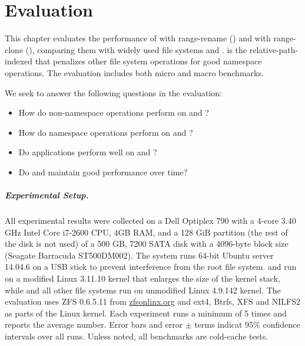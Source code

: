 \chapter{Evaluation}
\label{chap:eval}

This chapter evaluates the performance of \betrfs with
range-rename (\betrfsFour) and \betrfs with range-clone (\betrfsFive),
comparing them with widely used file systems and \betrfsThree.
\betrfsThree is the relative-path-indexed \betrfs that penalizes other file system
operations for good namespace operations.
The evaluation includes both micro and macro benchmarks.

We seek to answer the following questions in the evaluation:
\begin{itemize}
\item How do non-namespace operations perform on \betrfsFour and \betrfsFive?
\item How do namespace operations perform on \betrfsFour and \betrfsFive?
\item Do applications perform well on \betrfsFour and \betrfsFive?
\item Do \betrfsFour and \betrfsFive maintain good performance over time?
\end{itemize}

\paragraph{Experimental Setup.}

All experimental results were collected on
a Dell Optiplex 790 with a 4-core 3.40 GHz Intel Core i7-2600 CPU,
4GB RAM,
and a 128 GiB partition (the rest of the disk is not used)
of a 500 GB, 7200 SATA disk with a 4096-byte block size
(Seagate Barracuda ST500DM002).
The system runs 64-bit Ubuntu server 14.04.6 on a USB stick to prevent
interference from the root file system.
\betrfsThree and \betrfsFour run on a modified Linux 3.11.10 kernel that
enlarges the size of the kernel stack,
while \betrfsFive and all other file systems run on unmodified Linux 4.9.142 kernel.
The evaluation uses ZFS 0.6.5.11 from \url{zfsonlinx.org} and
ext4, Btrfs, XFS and NILFS2 as parts of the Linux kernel.
Each experiment runs a minimum of 5 times and reports the average number.
Error bars and error $\pm$ terms indicat 95\% confidence intervals over all runs.
Unless noted, all benchmarks are cold-cache tests.

